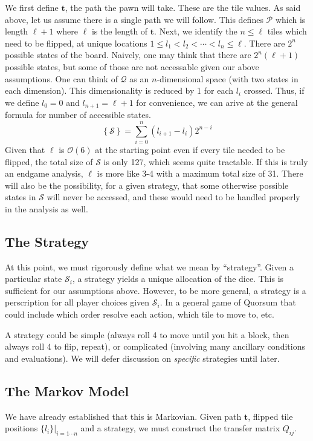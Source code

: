 \documentclass[letterpaper,11pt]{article}
\begin{document}
We first define $\mathbf{t}$, the path the pawn will take.
These are the tile values.  As said above, let us assume there is a single
path we will follow.  This defines $\mathcal{P}$ which is length $\ell+1$ where
$\ell$ is the length of $\mathbf{t}$.  Next, we identify the $n\leq \ell$ 
tiles which need to be flipped, at unique locations $1\leq l_1 < l_2 < \cdots < l_n \leq \ell$.  There are
$2^n$ possible states of the board.  Naively, one may think that there are
$2^n(\ell+1)$ possible states, but some of those are not accessable given our
above assumptions.  One can think of $\mathcal{Q}$ as an $n$-dimensional space
(with two states in each dimension).  This dimensionality is reduced by 1
for each $l_i$ crossed.  Thus, if we define $l_0=0$ and $l_{n+1}=\ell+1$ for
convenience, we can arive at the general formula for number of accessible
states.
\begin{equation}
	\left\{\mathcal{S}\right\} = \sum_{i=0}^{n} (l_{i+1}-l_i)2^{n-i}
\end{equation}
Given that $\ell$ is $\mathcal{O}(6)$ at the starting point even if every tile
needed to be flipped, the total size of $\mathcal{S}$ is only 127, which seems
quite tractable.  If this is truly an endgame analysis, $\ell$ is more like 3-4
with a maximum total size of 31.  There will also be the possibility, for a
given strategy, that some otherwise possible states in $\mathcal{S}$ will never
be accessed, and these would need to be handled properly in the analysis as
well.

\subsection{The Strategy}
At this point, we must rigorously define what we mean by ``strategy''.  Given
a particular state $\mathcal{S}_i$, a strategy yields a unique allocation of
the dice.  This is sufficient for our assumptions above.  However, to be more
general, a strategy is a perscription for all player choices given 
$\mathcal{S}_i$.  In a general game of Quorsum that could include which order
resolve each action, which tile to move to, etc.

A strategy could be simple (always roll 4 to move until you hit a block, then
always roll 4 to flip, repeat), or complicated (involving many ancillary
conditions and evaluations).  We will defer discussion on \textit{specific}
strategies until later.  

\subsection{The Markov Model}
We have already established that this is Markovian.  Given path $\mathbf{t}$,
flipped tile positions $\{l_i\}|_{i=1\cdots n}$ and a strategy, we must
construct the transfer matrix $Q_{ij}$.
\end{document}
